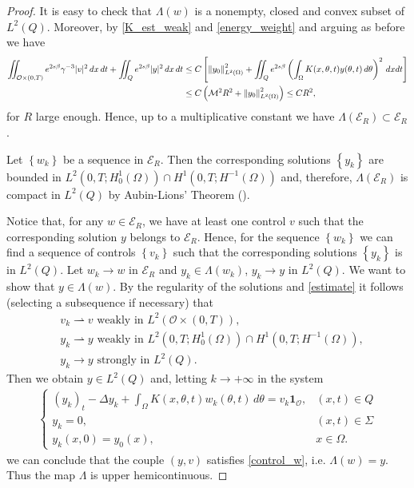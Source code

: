 \documentclass{amsart}    %
\newcommand{\D}{\displaystyle}
\newcommand{\norm}[2]{\left\|#1\right\|_{#2}}
\newcommand{\intd}{\displaystyle\int \kern -7pt \int}
\begin{document}
\begin{proof}
It is easy to check that $\Lambda(w)$ is a nonempty, closed and convex subset of $L^2(Q)$. Moreover, by \eqref{K_est_weak} and \eqref{energy_weight} and arguing as before we have
\begin{align}\label{estimate}
	\intd_{\mathcal O\times(0,T)} e^{2s\beta}\gamma^{-3} |v|^2\,dx\,dt + \intd_Q e^{2s\beta}|y|^2\,dx\,dt 
&\leq C \left[\norm{y_0}{L^2(\Omega)}^2 + \intd_Qe^{2s\beta}\left(\int_\Omega K(x,\theta,t)y(\theta,t)\,d\theta\right)^2\,dxdt\right] \notag 
	\\
	&\leq C\left(\mathcal M^2R^2 + \norm{y_0}{L^2(\Omega)}^2\right) \leq CR^2,
\end{align}
for $R$ large enough. Hence, up to a multiplicative constant we have $\Lambda(\mathcal E_R)\subset \mathcal E_R$. 

Let $\left\{w_k\right\}$ be a sequence in $\mathcal E_R$. Then the corresponding solutions $\left\{y_k\right\}$ are bounded in $L^2(0,T;H^1_0(\Omega))\cap H^1(0,T;H^{-1}(\Omega))$ and, therefore, $\Lambda(\mathcal E_R)$ is compact in $L^2(Q)$ by Aubin-Lions' Theorem (\cite{simon1986compact}).

Notice that, for any $w\in \mathcal E_R$, we have at least one control $v$ such that the corresponding solution $y$ belongs to $\mathcal E_R$. Hence, for the sequence $\left\{w_k\right\}$ we can find a sequence of controls $\left\{v_k\right\}$ such that the corresponding solutions $\left\{y_k\right\}$ is in $L^2(Q)$. Let $w_k\to w$ in $\mathcal E_R$ and $y_k\in \Lambda(w_k)$, $y_k\to y$ in $L^2(Q)$. We want to show that $y\in\Lambda(w)$. By the regularity of the solutions and \eqref{estimate} it follows (selecting a subsequence if necessary) that
\begin{align*}
	& v_k\rightharpoonup v \textrm{ weakly in } L^2(\mathcal O\times(0,T)),
	\\
	& y_k\rightharpoonup y \textrm{ weakly in } L^2(0,T;H^1_0(\Omega))\cap H^1(0,T;H^{-1}(\Omega)),
	\\
	& y_k\to y \textrm{ strongly in } L^2(Q). 
\end{align*}
Then we obtain $y\in L^2(Q)$ and, letting $k\to +\infty$ in the system 
\begin{align*}
	\begin{cases}
		\D (y_k)_t - \Delta y_k + \int_\Omega K(x,\theta,t)w_k(\theta,t)\,d\theta = v_k\mathbf{1}_{\mathcal O}, & (x,t)\in Q
		\\
		y_k = 0, & (x,t)\in\Sigma
		\\
		y_k(x,0) = y_0(x), & x\in\Omega.
	\end{cases}
\end{align*} 
we can conclude that the couple $(y,v)$ satisfies \eqref{control_w}, i.e. $\Lambda(w) = y$. Thus the map $\Lambda$ is upper hemicontinuous.


\end{proof}
\end{document}
